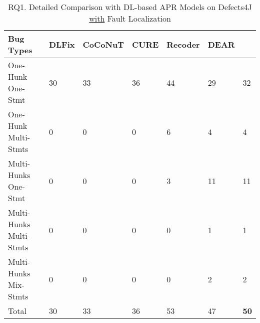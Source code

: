 \begin{table}
	\caption{RQ1. Detailed Comparison with DL-based APR Models on Defects4J \underline{with} Fault Localization}
	\vspace{-10pt}
	\begin{center}
        \small
          \tabcolsep 2.5pt
		\renewcommand{\arraystretch}{1} 
\begin{tabular}{p{2.9cm}<{\centering}|p{0.7cm}<{\centering}|p{1.1cm}<{\centering}|p{0.6cm}<{\centering}|p{0.8cm}<{\centering}|p{0.7cm}<{\centering}|p{0.7cm}}
			\hline
			Bug Types & DLFix& CoCoNuT & CURE & Recoder & DEAR & {\tool}\\\hline
			
			One-Hunk One-Stmt  & 30 & 33 & 36 & 44 & 29 & 32\\
			One-Hunk Multi-Stmts  & 0 &0 & 0 & 6 & 4 & 4\\ 
			Multi-Hunks One-Stmt  & 0 &0 & 0 & 3 & 11 &  11\\
			Multi-Hunks Multi-Stmts  & 0 &0 & 0 & 0 & 1 & 1\\
			Multi-Hunks Mix-Stmts  & 0 & 0 & 0 & 0 & 2 & 2\\\hline
			Total & 30 & 33 & 36 & 53 & 47 & {\bf 50}\\
			\hline
		\end{tabular}
		\label{RQ1_1}
	\end{center}
\vspace{-3pt}
\end{table}
















